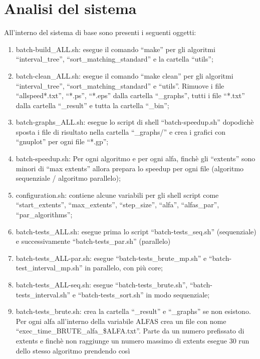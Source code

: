\documentclass[a4paper,11pt]{report}
\begin{document}
\chapter{Analisi del sistema}

All'interno del sistema di base sono presenti i seguenti oggetti:
\begin{enumerate}
 \item batch-build\_ALL.sh: esegue il comando ``make'' per gli algoritmi ``interval\_tree'', ``sort\_matching\_standard'' 
 e la cartella ``utils'';
 \item batch-clean\_ALL.sh: esegue il comando ``make clean'' per gli algoritmi ``interval\_tree'', 
 ``sort\_matching\_standard'' e ``utils''. Rimuove i file ``allspeed*.txt'', ``*.ps'', ``*.eps'' dalla cartella
 ``\_graphs'', tutti i file ``*.txt'' dalla cartella ``\_result'' e tutta la cartella ``\_bin'';
 \item batch-graphs\_ALL.sh: esegue lo script di shell ``batch-speedup.sh'' dopodich\`e sposta i file di risultato
 nella cartella ``\_graphs/'' e crea i grafici con ``gnuplot'' per ogni file ``*.gp'';
 \item batch-speedup.sh: Per ogni algoritmo e per ogni alfa, finch\`e gli ``extents'' sono minori di ``max extents'' 
 allora prepara lo speedup per ogni file (algoritmo sequenziale / algoritmo parallelo);
 \item configuration.sh: contiene alcune variabili per gli shell script come ``start\_extents'', ``max\_extents'',
 ``step\_size'', ``alfa'', ``alfas\_par'', \newline``par\_algorithms'';
 \item batch-tests\_ALL.sh: esegue prima lo script ``batch-tests\_seq.sh'' (sequenziale) e successivamente
 ``batch-tests\_par.sh'' (parallelo)
 \item batch-tests\_ALL-par.sh: esegue ``batch-tests\_brute\_mp.sh'' e ``batch-test\_interval\_mp.sh'' in parallelo,
 con pi\`u core;
 \item batch-tests\_ALL-seq.sh: esegue ``batch-tests\_brute.sh'', \newline``batch-tests\_interval.sh'' e ``batch-tests\_sort.sh''
 in modo sequenziale;
 \item batch-tests\_brute.sh: crea la cartella ``\_result'' e ``\_graphs'' se non esistono. Per ogni alfa all'interno 
 della variabile ALFAS crea un file con nome ``exec\_time\_BRUTE\_alfa\_\$ALFA.txt''. Parte da un numero prefissato di
 extents e finch\`e non raggiunge un numero massimo di extents esegue 30 run dello stesso algoritmo prendendo cos\`i 

\end{enumerate}
\end{document}
